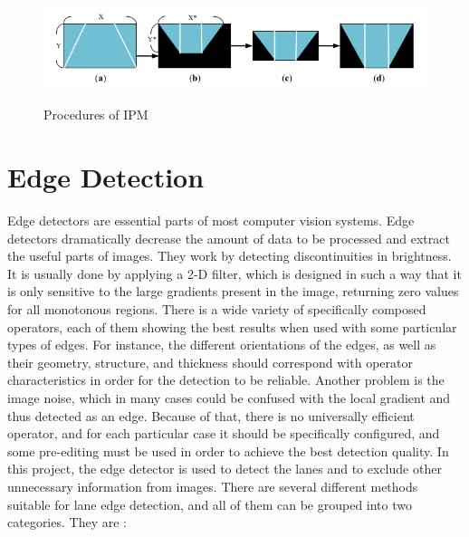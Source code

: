 \begin{figure}[H]
 \centering
  \includegraphics[width=1\textwidth]{./Bilder/Procedures_of_IPM.png}\label{Procedures_of_IPM}
  \caption{Procedures of IPM\cite{IPM}}
\end{figure}


%
\section{Edge Detection}\label{sec:Edge Detection}
%

Edge detectors are essential parts of most computer vision systems. Edge detectors dramatically decrease the amount of data to be processed and extract the useful parts of images. They work by detecting discontinuities in brightness. It is usually done by applying a 2-D filter, which is designed in such a way that it is only sensitive to the large gradients present in the image, returning zero values for all monotonous regions. There is a wide variety of specifically composed operators, each of them showing the best results when used with some particular types of edges. For instance, the different orientations of the edges, as well as their geometry, structure, and thickness should correspond with operator characteristics in order for the detection to be reliable. Another problem is the image noise, which in many cases could be confused with the local gradient and thus detected as an edge. Because of that, there is no universally efficient operator, and for each particular case it should be specifically configured, and some pre-editing must be used in order to achieve the best detection quality. In this project, the edge detector is used to detect the lanes and to exclude other unnecessary information from images. There are several different methods suitable for lane edge detection, and all of them can be grouped into two categories. They are :

